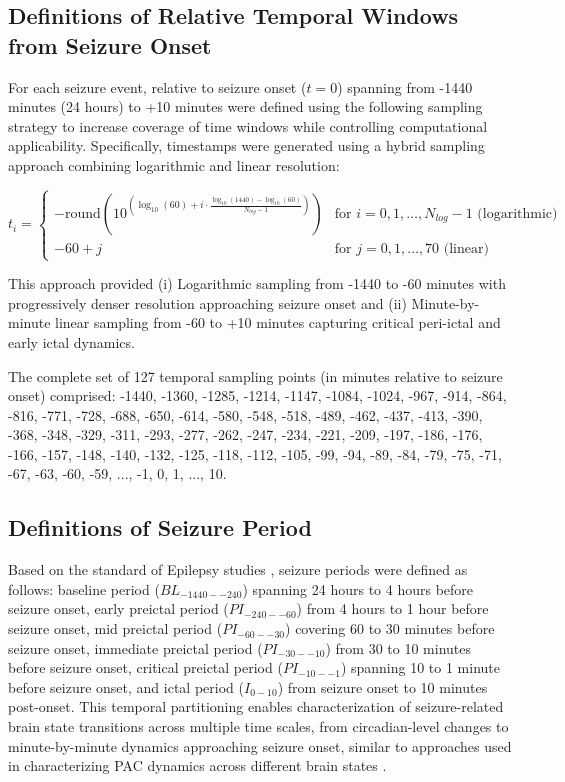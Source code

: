 \subsection{Definitions of Relative Temporal Windows from Seizure Onset}
For each seizure event, relative to seizure onset ($t = 0$) spanning from -1440 minutes (24 hours) to +10 minutes were defined using the following sampling strategy to increase coverage of time windows while controlling computational applicability. Specifically, timestamps were generated using a hybrid sampling approach combining logarithmic and linear resolution:

\begin{equation}
t_i = \begin{cases}
-\text{round}(10^{(\log_{10}(60) + i \cdot \frac{\log_{10}(1440) - \log_{10}(60)}{N_{log}-1})}) & \text{for } i = 0, 1, \ldots, N_{log}-1 \text{ (logarithmic)} \\
-60 + j & \text{for } j = 0, 1, \ldots, 70 \text{ (linear)}
\end{cases}
\end{equation}

This approach provided (i) Logarithmic sampling from -1440 to -60 minutes with progressively denser resolution approaching seizure onset and (ii) Minute-by-minute linear sampling from -60 to +10 minutes capturing critical peri-ictal and early ictal dynamics.

The complete set of 127 temporal sampling points (in minutes relative to seizure onset) comprised: -1440, -1360, -1285, -1214, -1147, -1084, -1024, -967, -914, -864, -816, -771, -728, -688, -650, -614, -580, -548, -518, -489, -462, -437, -413, -390, -368, -348, -329, -311, -293, -277, -262, -247, -234, -221, -209, -197, -186, -176, -166, -157, -148, -140, -132, -125, -118, -112, -105, -99, -94, -89, -84, -79, -75, -71, -67, -63, -60, -59, ..., -1, 0, 1, ..., 10.


\subsection{Definitions of Seizure Period}

Based on the standard of Epilepsy studies \cite{Kuhlmann2018SeizurePA}, seizure periods were defined as follows: baseline period ($BL_{-1440--240}$) spanning 24 hours to 4 hours before seizure onset, early preictal period ($PI_{-240--60}$) from 4 hours to 1 hour before seizure onset, mid preictal period ($PI_{-60--30}$) covering 60 to 30 minutes before seizure onset, immediate preictal period ($PI_{-30--10}$) from 30 to 10 minutes before seizure onset, critical preictal period ($PI_{-10--1}$) spanning 10 to 1 minute before seizure onset, and ictal period ($I_{0-10}$) from seizure onset to 10 minutes post-onset. This temporal partitioning enables characterization of seizure-related brain state transitions across multiple time scales, from circadian-level changes to minute-by-minute dynamics approaching seizure onset, similar to approaches used in characterizing PAC dynamics across different brain states \cite{Mikutta2019PhaseamplitudeCOAE}.

